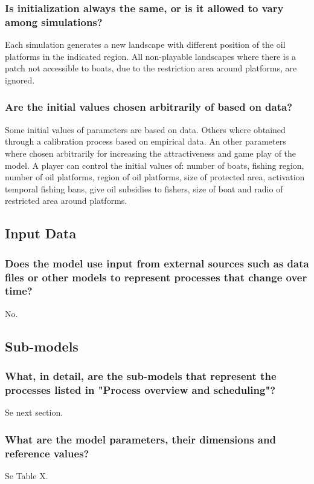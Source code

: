 \documentclass[11pt]{article}
\begin{document}
\subsubsection{Is initialization always the same, or is it allowed to vary among simulations?}
\label{sec:orgf8e2ce0}
Each simulation generates a new landscape with different position of the oil platforms in the indicated region. All non-playable landscapes where there is a patch not accessible to boats, due to the restriction area around platforms, are ignored.
\subsubsection{Are the initial values chosen arbitrarily of based on data?}
\label{sec:org85af68c}
Some initial values of parameters are based on data. Others where obtained through a calibration process based on empirical data. An other parameters where chosen arbitrarily for increasing the attractiveness and game play of the model.
A player can control the initial values of: number of boats, fishing region, number of oil platforms, region of oil platforms, size of protected area, activation temporal fishing bans, give oil subsidies to fishers, size of boat and radio of restricted area around platforms.
\subsection{Input Data}
\label{sec:org2667c4e}
\subsubsection{Does the model use input from external sources such as data files or other models to represent processes that change over time?}
\label{sec:org25639bf}
No.
\subsection{Sub-models}
\label{sec:org5361263}
\subsubsection{What, in detail, are the sub-models that represent the processes listed in "Process overview and scheduling"?}
\label{sec:org4325e9b}
Se next section.
\subsubsection{What are the model parameters, their dimensions and reference values?}
\label{sec:orgdbf181f}
Se Table X.
\end{document}

